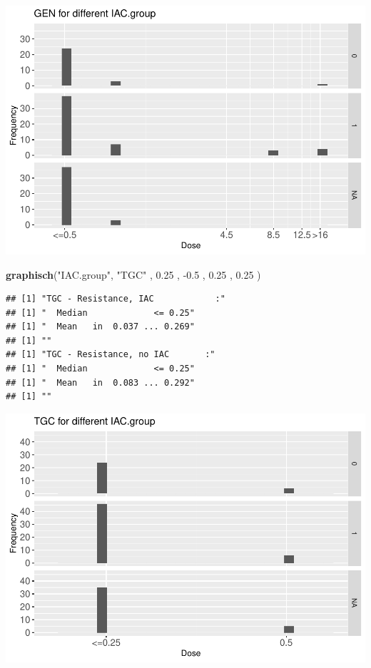 \documentclass[
]{article}
\newenvironment{Shaded}{\begin{snugshade}}{\end{snugshade}}
\newcommand{\FloatTok}[1]{\textcolor[rgb]{0.00,0.00,0.81}{#1}}
\newcommand{\KeywordTok}[1]{\textcolor[rgb]{0.13,0.29,0.53}{\textbf{#1}}}
\newcommand{\NormalTok}[1]{#1}
\newcommand{\StringTok}[1]{\textcolor[rgb]{0.31,0.60,0.02}{#1}}
\begin{document}
\includegraphics{Verteilungen_files/figure-latex/unnamed-chunk-9-1.pdf}

\begin{Shaded}
\begin{Highlighting}[]
   \KeywordTok{graphisch}\NormalTok{(}\StringTok{"IAC.group"}\NormalTok{, }\StringTok{"TGC"}\NormalTok{ , }\FloatTok{0.25}\NormalTok{ ,  }\FloatTok{-0.5}\NormalTok{ ,   }\FloatTok{0.25}\NormalTok{ ,   }\FloatTok{0.25}\NormalTok{ )  }
\end{Highlighting}
\end{Shaded}

\begin{verbatim}
## [1] "TGC - Resistance, IAC            :"
## [1] "  Median             <= 0.25"
## [1] "  Mean   in  0.037 ... 0.269"
## [1] ""
## [1] "TGC - Resistance, no IAC       :"
## [1] "  Median             <= 0.25"
## [1] "  Mean   in  0.083 ... 0.292"
## [1] ""
\end{verbatim}

\includegraphics{Verteilungen_files/figure-latex/unnamed-chunk-10-1.pdf}
\end{document}
